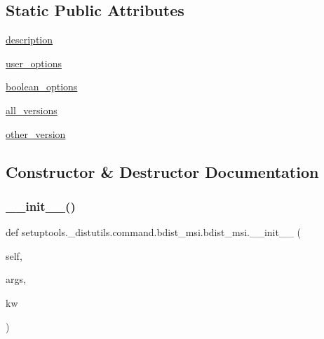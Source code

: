 \subsection*{Static Public Attributes}
\begin{DoxyCompactItemize}
\item 
\hyperlink{classsetuptools_1_1__distutils_1_1command_1_1bdist__msi_1_1bdist__msi_a750f36a0b022001f649767e3b0d74371}{description}
\item 
\hyperlink{classsetuptools_1_1__distutils_1_1command_1_1bdist__msi_1_1bdist__msi_a932b7e6036dfabdc4352d338180400e5}{user\+\_\+options}
\item 
\hyperlink{classsetuptools_1_1__distutils_1_1command_1_1bdist__msi_1_1bdist__msi_afdf624d1238a2122db41bd46b58c8ee1}{boolean\+\_\+options}
\item 
\hyperlink{classsetuptools_1_1__distutils_1_1command_1_1bdist__msi_1_1bdist__msi_a7ecb257464afa566f216104d1fdd598e}{all\+\_\+versions}
\item 
\hyperlink{classsetuptools_1_1__distutils_1_1command_1_1bdist__msi_1_1bdist__msi_acf24b684d1beafd8cfaf03811a2ecb29}{other\+\_\+version}
\end{DoxyCompactItemize}


\subsection{Constructor \& Destructor Documentation}
\mbox{\label{classsetuptools_1_1__distutils_1_1command_1_1bdist__msi_1_1bdist__msi_ab68db61bc6472fab8fcd3ba3415e1fef}} 
\subsubsection{\texorpdfstring{\+\_\+\+\_\+init\+\_\+\+\_\+()}{\_\_init\_\_()}}
{\footnotesize\ttfamily def setuptools.\+\_\+distutils.\+command.\+bdist\+\_\+msi.\+bdist\+\_\+msi.\+\_\+\+\_\+init\+\_\+\+\_\+ (\begin{DoxyParamCaption}\item[{}]{self,  }\item[{}]{args,  }\item[{}]{kw }\end{DoxyParamCaption})}



